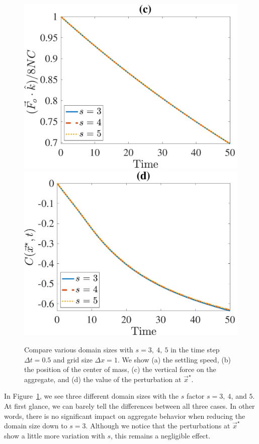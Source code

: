\begin{figure}[ht]
\begin{center}
		\includegraphics[scale=0.35]{./figures/fig_NC10_s_Fo3_all}
		\includegraphics[scale=0.35]{./figures/fig_NC10_s_C_star}
	\caption{Compare various domain sizes with $ s = 3, \ 4, \ 5$ in the time step  $\Delta t = 0.5$ and grid size $\Delta x = 1$. We show (a) the settling speed, (b) the position of the center of mass, (c) the vertical force on the aggregate, and (d) the value of the perturbation at $\vec{x}^{\star}$.}
	\label{fig_NC10_compare_s}
\end{center}
\end{figure}
\par
In Figure~\ref{fig_NC10_compare_s}, we see three different domain sizes with the $s$ factor $s = 3, \ 4$, and $5$. At first glance, we can barely tell the differences between all three cases. In other words, there is no significant impact on aggregate behavior when reducing the domain size down to $s = 3$. Although we notice that the perturbations at $\vec{x}^{\star}$ show a little more variation with $s$, this remains a negligible effect.

